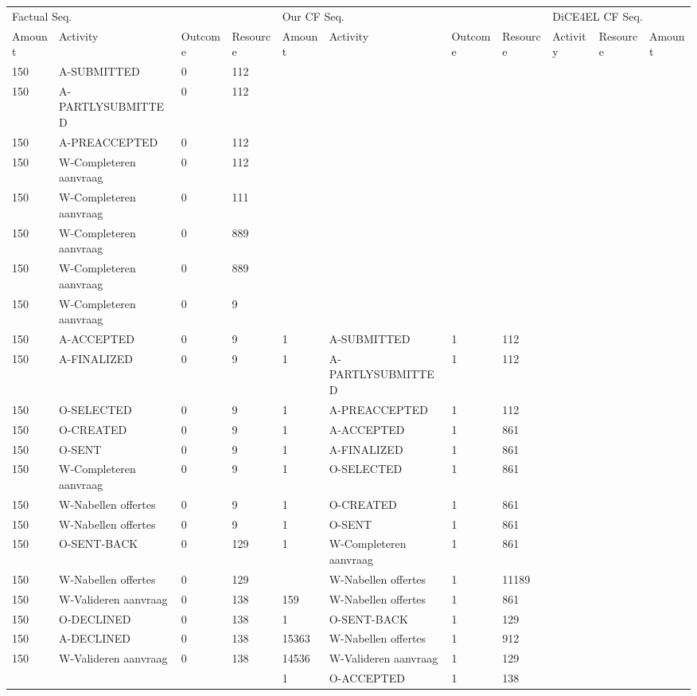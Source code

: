 \begin{tabular}{lllllllllll}
\toprule
\multicolumn{4}{l}{Factual Seq.} & \multicolumn{4}{l}{Our CF Seq.} & \multicolumn{3}{l}{DiCE4EL CF Seq.} \\
Amount & Activity & Outcome & Resource & Amount & Activity & Outcome & Resource & Activity & Resource & Amount \\
\midrule
150 & A-SUBMITTED & 0 & 112 &  &  &  &  &  &  &  \\
150 & A-PARTLYSUBMITTED & 0 & 112 &  &  &  &  &  &  &  \\
150 & A-PREACCEPTED & 0 & 112 &  &  &  &  &  &  &  \\
150 & W-Completeren aanvraag & 0 & 112 &  &  &  &  &  &  &  \\
150 & W-Completeren aanvraag & 0 & 111 &  &  &  &  &  &  &  \\
150 & W-Completeren aanvraag & 0 & 889 &  &  &  &  &  &  &  \\
150 & W-Completeren aanvraag & 0 & 889 &  &  &  &  &  &  &  \\
150 & W-Completeren aanvraag & 0 & 9 &  &  &  &  &  &  &  \\
150 & A-ACCEPTED & 0 & 9 & 1 & A-SUBMITTED & 1 & 112 &  &  &  \\
150 & A-FINALIZED & 0 & 9 & 1 & A-PARTLYSUBMITTED & 1 & 112 &  &  &  \\
150 & O-SELECTED & 0 & 9 & 1 & A-PREACCEPTED & 1 & 112 &  &  &  \\
150 & O-CREATED & 0 & 9 & 1 & A-ACCEPTED & 1 & 861 &  &  &  \\
150 & O-SENT & 0 & 9 & 1 & A-FINALIZED & 1 & 861 &  &  &  \\
150 & W-Completeren aanvraag & 0 & 9 & 1 & O-SELECTED & 1 & 861 &  &  &  \\
150 & W-Nabellen offertes & 0 & 9 & 1 & O-CREATED & 1 & 861 &  &  &  \\
150 & W-Nabellen offertes & 0 & 9 & 1 & O-SENT & 1 & 861 &  &  &  \\
150 & O-SENT-BACK & 0 & 129 & 1 & W-Completeren aanvraag & 1 & 861 &  &  &  \\
150 & W-Nabellen offertes & 0 & 129 &  & W-Nabellen offertes & 1 & 11189 &  &  &  \\
150 & W-Valideren aanvraag & 0 & 138 & 159 & W-Nabellen offertes & 1 & 861 &  &  &  \\
150 & O-DECLINED & 0 & 138 & 1 & O-SENT-BACK & 1 & 129 &  &  &  \\
150 & A-DECLINED & 0 & 138 & 15363 & W-Nabellen offertes & 1 & 912 &  &  &  \\
150 & W-Valideren aanvraag & 0 & 138 & 14536 & W-Valideren aanvraag & 1 & 129 &  &  &  \\
 &  &  &  & 1 & O-ACCEPTED & 1 & 138 &  &  &  \\
\bottomrule
\end{tabular}
